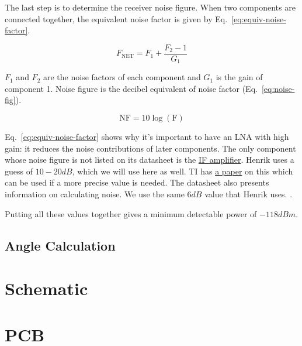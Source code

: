\documentclass{default}
\begin{document}
The last step is to determine the receiver noise figure. When two components are connected together,
the equivalent noise factor is given by Eq.~\ref{eq:equiv-noise-factor}.

\begin{equation}
        \label{eq:equiv-noise-factor}
        F_{\text{NET}} = F_1 + \frac{F_2 - 1}{G_1}
\end{equation}

$F_1$ and $F_2$ are the noise factors of each component and $G_1$ is the gain of component 1. Noise
figure is the decibel equivalent of noise factor (Eq.~\ref{eq:noise-fig}).

\begin{equation}
        \label{eq:noise-fig}
        \text{NF} = 10 \log(\text{F})
\end{equation}

Eq.~\ref{eq:equiv-noise-factor} shows why it's important to have an LNA with high gain: it reduces
the noise contributions of later components. The only component whose noise figure is not listed on
its datasheet is the \hyperref[sec:ada4940-2]{IF amplifier}. Henrik uses a guess of
$10 - 20 \si{dB}$, which we will use here as well. TI has
\href{http://www.ti.com/lit/an/slyt094/slyt094.pdf}{a paper} on this which can be used if a more
precise value is needed. The datasheet also presents information on calculating noise. We use the
same $6 \si{dB}$ value that Henrik uses. .

Putting all these values together gives a minimum detectable power of $-118 \si{dBm}$.

\section{Angle Calculation}
\label{sec:angle}


\chapter{Schematic}
\label{cha:schematic}











\chapter{PCB}
\label{cha:pcb}
\end{document}
